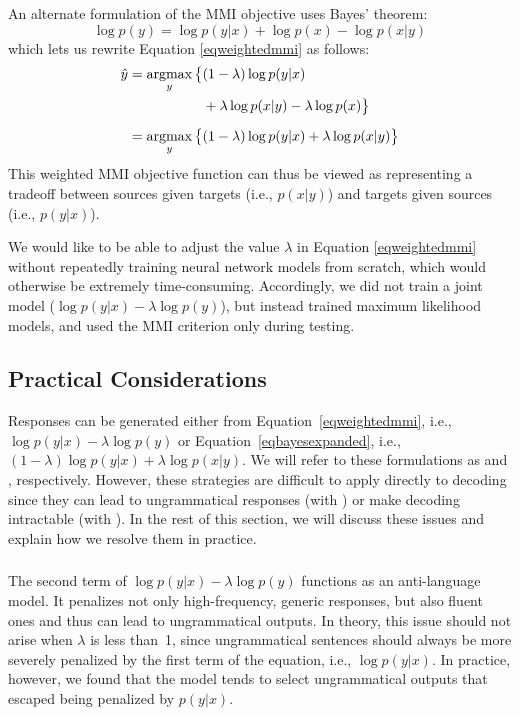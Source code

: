 An alternate formulation of the MMI objective uses Bayes' theorem:
\begin{equation*}
\log p(y)=\log p(y|x)+\log p(x)-\log p(x|y)
\label{eqbayes}
\end{equation*}
which lets us rewrite Equation \ref{eqweightedmmi} as follows:
\begin{equation}
\begin{aligned}
\hat{y}%
&=\argmax_{y} \big\{(1-\lambda)\log p(y|x)\\
&~~~~~~~~~~~~~~~~+\lambda\log p(x|y)-\lambda\log p(x) \big\} \\[0.2cm]
&=\argmax_{y} \big\{(1-\lambda)\log p(y|x)+\lambda\log p(x|y) \big\}
\label{eqbayesexpanded}
\end{aligned}
\end{equation}
This weighted MMI objective function can thus be viewed as representing a tradeoff between sources given targets (i.e., $p(x|y)$) and targets given sources (i.e., $p(y|x)$). 

We would like to be able to 
adjust the value $\lambda$ in Equation \ref{eqweightedmmi} without repeatedly training neural network models from scratch, which would otherwise be extremely time-consuming.
Accordingly, we did not train a joint model ($\log p(y|x) - \lambda \log p(y)$), but instead trained maximum likelihood models, and used the MMI criterion only during testing.

\subsection{Practical Considerations}
Responses can be generated either from Equation~\ref{eqweightedmmi},  i.e., $\log p(y|x)-\lambda \log p(y)$ or Equation~\ref{eqbayesexpanded}, i.e., $(1-\lambda) \log p(y|x)+\lambda \log p(x|y)$. 
We will refer to these formulations as \mmiLM and \mmiBD, respectively.
However, these strategies are difficult to apply directly to decoding since they can lead to ungrammatical responses 
(with \mmiLM)
or make decoding intractable 
(with \mmiBD).
In the rest of this section, we will discuss these issues and explain how we resolve them in practice. 
 
\subsubsection{\mmiLM}
The second term of $\log p(y|x)-\lambda \log p(y)$
functions as an anti-language model.
It penalizes not only high-frequency, generic responses, but also fluent ones and thus can lead to ungrammatical outputs. 
In theory, this issue should not arise when $\lambda$ is less than~1, since ungrammatical sentences should always be more severely penalized by the first term of the equation, i.e., $\log p(y|x)$.
 In practice, however, we found that the model tends to select ungrammatical outputs that escaped being penalized by $p(y|x)$. 
 
